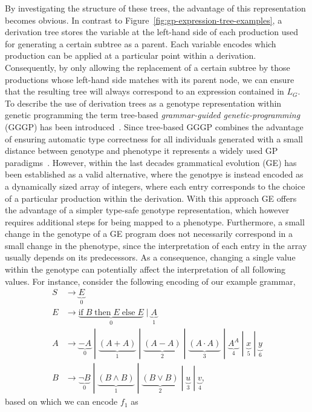 By investigating the structure of these trees, the advantage of this representation becomes obvious.
In contrast to Figure~\ref{fig:gp-expression-tree-examples}, a derivation tree stores the variable at the left-hand side of each production used for generating a certain subtree as a parent.
Each variable encodes which production can be applied at a particular point within a derivation.
Consequently, by only allowing the replacement of a certain subtree by those productions whose left-hand side matches with its parent node, we can ensure that the resulting tree will always correspond to an expression contained in $L_G$. 
To describe the use of derivation trees as a genotype representation within genetic programming the term tree-based \emph{grammar-guided genetic-programming} (GGGP) has been introduced~\cite{mckay2010grammar}.
Since tree-based GGGP combines the advantage of ensuring automatic type correctness for all individuals generated with a small distance between genotype and phenotype it represents a widely used GP paradigms~\cite{mckay2010grammar}.
However, within the last decades grammatical evolution (GE) has been established as a valid alternative, where the genotpye is instead encoded as a dynamically sized array of integers, where each entry corresponds to the choice of a particular production within the derivation.
With this approach GE offers the advantage of a simpler type-safe genotype representation, which however requires additional steps for being mapped to a phenotype.
Furthermore, a small change in the genotype of a GE program does not necessarily correspond in a small change in the phenotype, since the interpretation of each entry in the array usually depends on its predecessors.
As a consequence, changing a single value within the genotype can potentially affect the interpretation of all following values.
For instance, consider the following encoding of our example grammar,
\begin{equation}
	\begin{split}
		S & \to \underbrace{E}_{0} \\
		E & \to \underbrace{\text{if} \; B \; \text{then} \; E \; \text{else} \; E}_{0} \; | \; \underbrace{A}_{1} \\
		A & \to \underbrace{-A}_0 \; | \; \underbrace{(A + A)}_{1} \; | \; \underbrace{(A - A)}_2 \; | \; \underbrace{(A \cdot A)}_{3} \; | \; \underbrace{A^A}_{4} \; | \; \underbrace{x}_{5} \; | \; \underbrace{y}_{6} \\  
		B & \to \underbrace{\neg B}_{0} \; | \; \underbrace{(B \wedge B)}_{1} \; | \; \underbrace{(B \vee B)}_{2} \; | \; \underbrace{u}_3 \; | \; \underbrace{v}_4,
	\end{split}
	\label{eq:gp-example-grammar-ge-encoding}
\end{equation}
based on which we can encode $f_1$ as %



